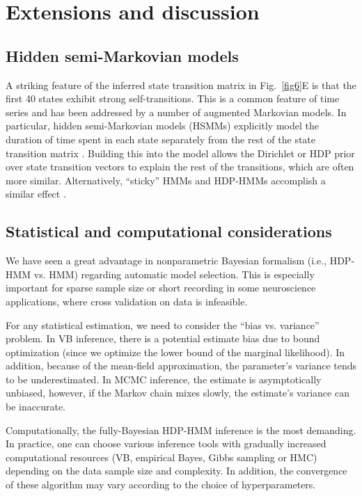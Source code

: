\section{Extensions and discussion}

\subsection{Hidden semi-Markovian models}
A striking feature of the inferred state transition matrix in Fig.~\ref{fig6}E is that the first 40 states exhibit strong self-transitions. This is a common feature of time series and has been addressed by a number of augmented Markovian models. In particular, hidden semi-Markovian models (HSMMs) explicitly model the duration of time spent in each state separately from the rest of the state transition matrix \citep{Johnson13}. Building this into the model allows the Dirichlet or HDP prior over state transition vectors to explain the rest of the transitions, which are often more similar. Alternatively, ``sticky'' HMMs and HDP-HMMs accomplish a similar effect \citep{Fox08}.  

\subsection{Statistical and computational considerations}  We have seen a great advantage in nonparametric Bayesian formalism (i.e., HDP-HMM vs. HMM) regarding automatic model selection. This is especially important for sparse sample size or short recording in some neuroscience applications, where cross validation on data is  infeasible.  

For any statistical estimation, we need to consider the ``bias vs. variance'' problem.  
In VB inference, there is a potential estimate bias due to bound optimization (since we optimize the lower bound of the marginal likelihood). In addition, because of the mean-field approximation, the parameter's variance tends to be underestimated. In MCMC inference, the estimate  is asymptotically unbiased, however, if the Markov chain mixes slowly, the estimate's variance can be inaccurate. 

Computationally, the fully-Bayesian HDP-HMM inference is the most demanding. In practice, one can choose various inference tools with gradually increased computational resources (VB, empirical Bayes, Gibbs sampling or HMC) depending on the data sample size and complexity. In addition, the convergence of these algorithm may vary according to the choice of hyperparameters. 


